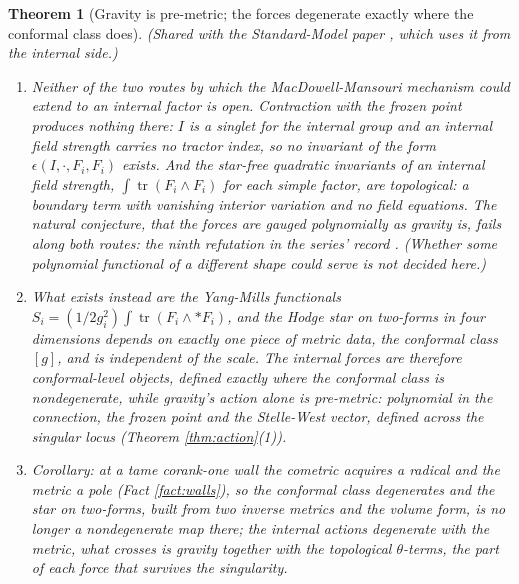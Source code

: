\documentclass[11pt]{article}
\newtheorem{theorem}{Theorem}[section]
\theoremstyle{definition}
\newcommand{\tr}{\operatorname{tr}}
\begin{document}
\begin{theorem}[Gravity is pre-metric; the forces degenerate exactly where the conformal class does]\label{thm:twokinds}
(Shared with the Standard-Model paper \cite{ButlerT12}, which uses it from the internal side.)
\begin{enumerate}
\item Neither of the two routes by which the MacDowell-Mansouri mechanism could extend to an internal factor is open. Contraction with the frozen point produces nothing there: $I$ is a singlet for the internal group and an internal field strength carries no tractor index, so no invariant of the form $\epsilon(I, \cdot, F_i, F_i)$ exists. And the star-free quadratic invariants of an internal field strength, $\int\tr(F_i\wedge F_i)$ for each simple factor, are topological: a boundary term with vanishing interior variation and no field equations. The natural conjecture, that the forces are gauged polynomially as gravity is, fails along both routes: the ninth refutation in the series' record \cite[Table~1, row 9]{ButlerT17}. (Whether some polynomial functional of a different shape could serve is not decided here.)
\item What exists instead are the Yang-Mills functionals $S_i = (1/2g_i^2)\int \tr(F_i \wedge {*}F_i)$, and the Hodge star on two-forms in four dimensions depends on exactly one piece of metric data, the conformal class $[g]$, and is independent of the scale. The internal forces are therefore \emph{conformal-level} objects, defined exactly where the conformal class is nondegenerate, while gravity's action alone is \emph{pre-metric}: polynomial in the connection, the frozen point and the Stelle-West vector, defined across the singular locus (Theorem \ref{thm:action}(1)).
\item Corollary: at a tame corank-one wall the cometric acquires a radical and the metric a pole (Fact \ref{fact:walls}), so the conformal class degenerates and the star on two-forms, built from two inverse metrics and the volume form, is no longer a nondegenerate map there; the internal actions degenerate with the metric, what crosses is gravity together with the topological $\theta$-terms, the part of each force that survives the singularity.
\end{enumerate}
\end{theorem}
\end{document}
